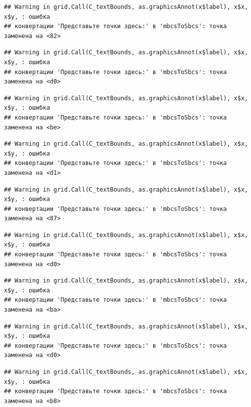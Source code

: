 \documentclass[]{book}
\begin{document}
\begin{verbatim}
## Warning in grid.Call(C_textBounds, as.graphicsAnnot(x$label), x$x, x$y, : ошибка
## конвертации 'Представьте точки здесь:' в 'mbcsToSbcs': точка заменена на <82>
\end{verbatim}

\begin{verbatim}
## Warning in grid.Call(C_textBounds, as.graphicsAnnot(x$label), x$x, x$y, : ошибка
## конвертации 'Представьте точки здесь:' в 'mbcsToSbcs': точка заменена на <d0>
\end{verbatim}

\begin{verbatim}
## Warning in grid.Call(C_textBounds, as.graphicsAnnot(x$label), x$x, x$y, : ошибка
## конвертации 'Представьте точки здесь:' в 'mbcsToSbcs': точка заменена на <be>
\end{verbatim}

\begin{verbatim}
## Warning in grid.Call(C_textBounds, as.graphicsAnnot(x$label), x$x, x$y, : ошибка
## конвертации 'Представьте точки здесь:' в 'mbcsToSbcs': точка заменена на <d1>
\end{verbatim}

\begin{verbatim}
## Warning in grid.Call(C_textBounds, as.graphicsAnnot(x$label), x$x, x$y, : ошибка
## конвертации 'Представьте точки здесь:' в 'mbcsToSbcs': точка заменена на <87>
\end{verbatim}

\begin{verbatim}
## Warning in grid.Call(C_textBounds, as.graphicsAnnot(x$label), x$x, x$y, : ошибка
## конвертации 'Представьте точки здесь:' в 'mbcsToSbcs': точка заменена на <d0>
\end{verbatim}

\begin{verbatim}
## Warning in grid.Call(C_textBounds, as.graphicsAnnot(x$label), x$x, x$y, : ошибка
## конвертации 'Представьте точки здесь:' в 'mbcsToSbcs': точка заменена на <ba>
\end{verbatim}

\begin{verbatim}
## Warning in grid.Call(C_textBounds, as.graphicsAnnot(x$label), x$x, x$y, : ошибка
## конвертации 'Представьте точки здесь:' в 'mbcsToSbcs': точка заменена на <d0>
\end{verbatim}

\begin{verbatim}
## Warning in grid.Call(C_textBounds, as.graphicsAnnot(x$label), x$x, x$y, : ошибка
## конвертации 'Представьте точки здесь:' в 'mbcsToSbcs': точка заменена на <b8>
\end{verbatim}
\end{document}
